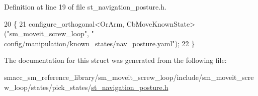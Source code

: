 Definition at line 19 of file st\+\_\+navigation\+\_\+posture.\+h.


\begin{DoxyCode}
20     \{
21         configure\_orthogonal<OrArm, CbMoveKnownState>(\textcolor{stringliteral}{"sm\_moveit\_screw\_loop"}, \textcolor{stringliteral}{"
      config/manipulation/known\_states/nav\_posture.yaml"});
22     \}
\end{DoxyCode}


The documentation for this struct was generated from the following file\+:\begin{DoxyCompactItemize}
\item 
smacc\+\_\+sm\+\_\+reference\+\_\+library/sm\+\_\+moveit\+\_\+screw\+\_\+loop/include/sm\+\_\+moveit\+\_\+screw\+\_\+loop/states/pick\+\_\+states/\hyperlink{sm__moveit__screw__loop_2include_2sm__moveit__screw__loop_2states_2pick__states_2st__navigation__posture_8h}{st\+\_\+navigation\+\_\+posture.\+h}\end{DoxyCompactItemize}
